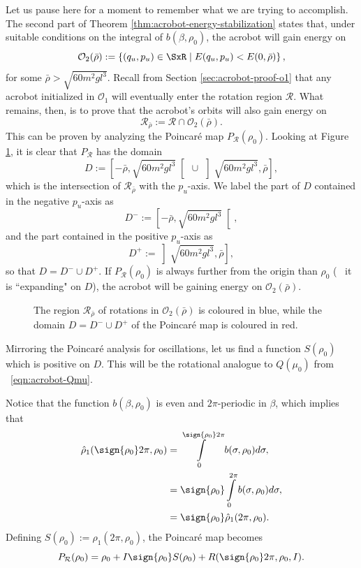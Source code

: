 Let us pause here for a moment to remember what we are trying to accomplish.
The second part of Theorem \ref{thm:acrobot-energy-stabilization} states that,
under suitable conditions on the integral of \(b(\beta,\rho_0)\), 
the acrobot will gain energy on 
\[
    \mathcal{O}_2(\bar{\rho}) := \left\{ (q_u,p_u) \in \SxR
    \mid E(q_u,p_u) < E(0,\bar{\rho}) \right\}
    ,
\]
for some \(\bar{\rho} > \sqrt{60m^2gl^3}\).
Recall from Section \ref{sec:acrobot-proof-o1} that any acrobot initialized in
\(\mathcal{O}_1\) will eventually enter the rotation region \(\mathcal{R}\).
What remains, then, is to prove that the acrobot's orbits will also gain
energy on
\[
    \mathcal{R}_{\bar{\rho}} := \mathcal{R} \cap \mathcal{O}_2(\bar{\rho})
    .
\]
This can be proven by analyzing the Poincar\'{e} map \(P_\mathcal{R}(\rho_0)\).
Looking at Figure \ref{fig:acrobot-rhobar-regions}, it is clear that
\(P_\mathcal{R}\) has the domain
\[
    D := \left[-\bar{\rho},\sqrt{60m^2gl^3}\right[ \, 
    \cup \, 
    \left]\sqrt{60m^2gl^3},\bar{\rho}\right]
    ,
\]
which is the intersection of \(\mathcal{R}_{\bar{\rho}}\) with the \(p_u\)-axis.
We label the part of \(D\) contained in the negative \(p_u\)-axis as
\[
    D^- :=\left[-\bar{\rho},\sqrt{60m^2gl^3}\right[
    ,
\]
and the part contained in the positive \(p_u\)-axis as
\[
    D^+ := \left]\sqrt{60m^2gl^3},\bar{\rho}\right]
    ,
\]
so that \(D = D^- \cup D^+\).
If \(P_\mathcal{R}(\rho_0)\) is always further from the origin than 
\(\rho_0\) (\ie~ it is ``expanding" on \(D\)), the acrobot will be gaining energy
on \(\mathcal{O}_2(\bar{\rho})\).

\begin{figure}
    \centering
    
    \caption{The region \(\mathcal{R}_{\bar{\rho}}\) of rotations in
        \(\mathcal{O}_2(\bar{\rho})\) is coloured
        in blue, while the domain \(D = D^- \cup D^+\) of the Poincar\'{e} map 
        is coloured in red.}
    \label{fig:acrobot-rhobar-regions}
\end{figure}

Mirroring the Poincar\'{e} analysis for oscillations, let us find a
function \(S(\rho_0)\) which is positive on \(D\).
This will be the rotational analogue to \(Q(\mu_0)\) from
~\eqref{eqn:acrobot-Qmu}.

Notice that the function \(b(\beta,\rho_0)\) is even and
\(2\pi\)-periodic in \(\beta\), which implies that
\begin{align*}
    \hat{\rho}_1(\sign{\rho_0}2\pi, \rho_0) &=
    \int \limits_0^{\sign{\rho_0}2\pi} b(\sigma,\rho_0)d\sigma
    , \\
     &=\sign{\rho_0}\int\limits_0^{2\pi}b(\sigma,\rho_0)d\sigma
     , \\
     &= \sign{\rho_0} \hat{\rho}_1(2\pi,\rho_0)
     .
\end{align*}
Defining \(S(\rho_0) := \hat{\rho}_1(2\pi,\rho_0)\),
the Poincar\'{e} map becomes
\begin{equation}\label{eqn:acrobot-poincare-r}
    P_\mathcal{R}(\rho_0) = \rho_0 + I\sign{\rho_0}S(\rho_0) 
    + R(\sign{\rho_0}2\pi,\rho_0,I)
    .
\end{equation}

